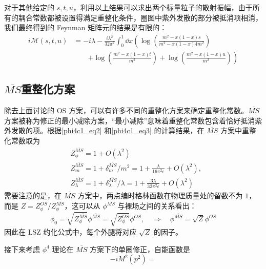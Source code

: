 对于其他给定的 $s,t,u$，利用以上结果可以求出两个标量粒子的散射振幅，由于所有的耦合常数都被设置得满足重整化条件，圈图中紫外发散的部分被抵消项相消，我们最终得到的 Feynman 矩阵元的结果是有限的：
\begin{equation}
\begin{aligned}
i\mathcal{M}(s,t,u)&=-i\lambda - \frac{i\lambda^2}{32\pi^2}\int_0^1 \dd x\left(\log\left(\frac{m^2-x(1-x)s}{m^2-x(1-x)4m^2}\right)\right.
\\
&\quad\quad\left.+
\log\left(\frac{m^2-x(1-x)t}{m^2}\right)
+
\log\left(\frac{m^2-x(1-x)u}{m^2}\right)
\right)
\end{aligned}
\end{equation}

\subsection{$\overline{MS}$重整化方案}

除去上面讨论的 OS 方案，可以有许多不同的重整化方案来确定重整化常数。$\overline{MS}$ 方案被称为修正的最小减除方案，“最小减除”意味着重整化常数包含着恰好抵消紫外发散的项。根据\autoref{phi4c1_eq2} 和\autoref{phi4c1_eq3} 的计算结果，在 $\overline{MS}$ 方案中重整化常数取为
\begin{equation}
\begin{aligned}
&Z^{\overline{MS}}_{\phi}=1+O(\lambda^2)\\
&Z^{\overline{MS}}_{m}=1+\delta^{\overline{MS}}_m/m^2 = 1+\frac{\lambda}{16\pi^2\epsilon}+O(\lambda^2),\\
&Z^{\overline{MS}}_{\lambda} = 1+\delta_\lambda^{\overline{MS}}/\lambda = 1+\frac{3\lambda}{32\pi^2\epsilon}+O(\lambda^2)
\end{aligned}
\end{equation}
需要注意的是，在 $\overline{MS}$ 方案中，两点编时格林函数在物理质量处的留数不为 $1$，而是 $Z=Z^{OS}_\phi/Z^{\overline{MS}}_\phi$，这可以从 $\phi^{\overline{MS}}$ 与裸场之间的关系看出：
\begin{equation}
\phi_0 = \sqrt{Z_\phi^{\overline{MS}}} \phi^{\overline{MS}} = \sqrt{Z_\phi^{OS}} \phi^{OS},\quad \Rightarrow \quad \phi^{\overline{MS}} = \sqrt{Z} \phi^{OS}
\end{equation}
因此在 LSZ 约化公式中，每个外腿将对应 $\sqrt{Z}$ 的因子。

接下来考虑 $\phi^4$ 理论在 $\overline{MS}$ 方案下的单圈修正，自能函数是
\begin{equation}
-iM^2(p^2)=
\end{equation}
